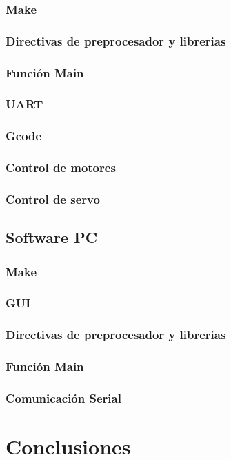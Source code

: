  \subsubsection{Make}
  \subsubsection{Directivas de preprocesador y librerias}
  \subsubsection{Función Main}
  \subsubsection{UART}
  \subsubsection{Gcode}
  \subsubsection{Control de motores}
  \subsubsection{Control de servo}
  \subsection{Software PC}
  \subsubsection{Make}
  \subsubsection{GUI}
  \subsubsection{Directivas de preprocesador y librerias}
  \subsubsection{Función Main}
  \subsubsection{Comunicación Serial}
  \section{Conclusiones}

  \nocite{atmega328Datasheet}
  \nocite{bjarneC++}
  \nocite{deitel}
  \nocite{make}
  \nocite{CProgramingMicro}
  \nocite{ControlPerifericosPaina}
  {}
  


